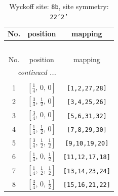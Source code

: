 \documentclass[fleqn,8pt]{jsarticle}
\begin{document}
\begin{longtable}{ccc}
\caption{Wyckoff site: {\tt 8b}, site symmetry: {\tt 22'2'}}
 \\
 \hline \hline
No. & position & mapping \\ \hline \endfirsthead

\multicolumn{2}{l}{\tablename\ \thetable{}} \\
 \hline \hline
No. & position & mapping \\ \hline \endhead

 \hline \hline
\multicolumn{2}{r}{\footnotesize\it continued ...} \\ \endfoot

 \hline \hline
\multicolumn{2}{r}{} \\ \endlastfoot

1 & $\left[ \frac{1}{4},\, 0,\, 0 \right]$ & {\tt [1,2,27,28]} \\ \hline
2 & $\left[ \frac{3}{4},\, \frac{1}{2},\, 0 \right]$ & {\tt [3,4,25,26]} \\ \hline
3 & $\left[ \frac{3}{4},\, 0,\, 0 \right]$ & {\tt [5,6,31,32]} \\ \hline
4 & $\left[ \frac{1}{4},\, \frac{1}{2},\, 0 \right]$ & {\tt [7,8,29,30]} \\ \hline
5 & $\left[ \frac{3}{4},\, \frac{1}{2},\, \frac{1}{2} \right]$ & {\tt [9,10,19,20]} \\ \hline
6 & $\left[ \frac{1}{4},\, 0,\, \frac{1}{2} \right]$ & {\tt [11,12,17,18]} \\ \hline
7 & $\left[ \frac{1}{4},\, \frac{1}{2},\, \frac{1}{2} \right]$ & {\tt [13,14,23,24]} \\ \hline
8 & $\left[ \frac{3}{4},\, 0,\, \frac{1}{2} \right]$ & {\tt [15,16,21,22]} \\
\end{longtable}
\renewcommand{\arraystretch}{1.2}
\end{document}
